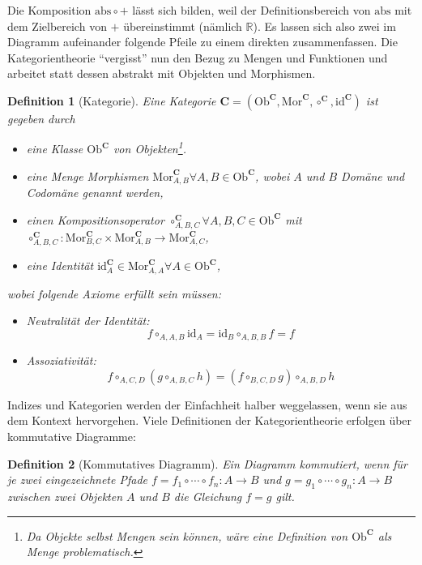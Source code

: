 \documentclass[a4paper, bibgerm]{article}
\newtheorem{defi}{Definition}
\begin{document}
Die Komposition $\mathrm{abs} \circ +$ lässt sich bilden, weil der
Definitionsbereich von $\mathrm{abs}$ mit dem Zielbereich von $+$
übereinstimmt (nämlich $\mathbb{R}$). Es lassen sich also zwei im
Diagramm aufeinander folgende Pfeile zu einem direkten
zusammenfassen. Die Kategorientheorie "`vergisst"' nun den Bezug zu
Mengen und Funktionen und arbeitet statt dessen abstrakt mit Objekten
und Morphismen. 

\begin{defi}[Kategorie]
Eine Kategorie $\mathbf{C} = (\mathrm{Ob}^\mathbf{C}, \mathrm{Mor}^\mathbf{C},
\circ^\mathbf{C}, \mathrm{id}^\mathbf{C})$ ist gegeben durch 
\begin{itemize}
\item eine Klasse $\mathrm{Ob}^\mathbf{C}$ von Objekten\footnote{Da Objekte selbst Mengen
    sein können, wäre eine Definition von $\mathrm{Ob}^\mathbf{C}$ als Menge problematisch.}.
\item eine Menge Morphismen $\mathrm{Mor}^\mathbf{C}_{A,B}\forall A,B \in
  \mathrm{Ob}^\mathbf{C}$, wobei $A$ und $B$ Domäne und Codomäne genannt werden,
\item einen Kompositionsoperator $\circ^\mathbf{C}_{A,B,C}\forall
  A,B,C \in \mathrm{Ob}^\mathbf{C}$ mit \\
  $\circ^\mathbf{C}_{A,B,C} : \mathrm{Mor}^\mathbf{C}_{B,C} \times
  \mathrm{Mor}^\mathbf{C}_{A,B} \rightarrow \mathrm{Mor}^\mathbf{C}_{A,C}$,
\item eine Identität $\mathrm{id}^\mathbf{C}_A \in \mathrm{Mor}^\mathbf{C}_{A,A}\forall A \in \mathrm{Ob}^\mathbf{C}$,
\end{itemize}
wobei folgende Axiome erfüllt sein müssen:
\begin{itemize}
\item Neutralität der Identität: $$f \circ_{A,A,B} \mathrm{id}_A = \mathrm{id}_B \circ_{A,B,B} f = f$$
\item Assoziativität:
  $$f \circ_{A,C,D} (g \circ_{A,B,C} h) = (f \circ_{B,C,D} g) \circ_{A,B,D}h$$
\end{itemize}
\end{defi}

Indizes und Kategorien werden der Einfachheit halber weggelassen, wenn
sie aus dem Kontext hervorgehen. Viele Definitionen der
Kategorientheorie erfolgen über kommutative Diagramme:

\begin{defi}[Kommutatives Diagramm]
  Ein Diagramm kommutiert, wenn für je zwei eingezeichnete Pfade $f=f_1
  \circ \cdots \circ f_n : A \rightarrow B$ und $g=g_1 \circ \cdots
  \circ g_n : A \rightarrow B$ zwischen zwei Objekten $A$
  und $B$ die Gleichung $f=g$ gilt.
\end{defi}
\end{document}
